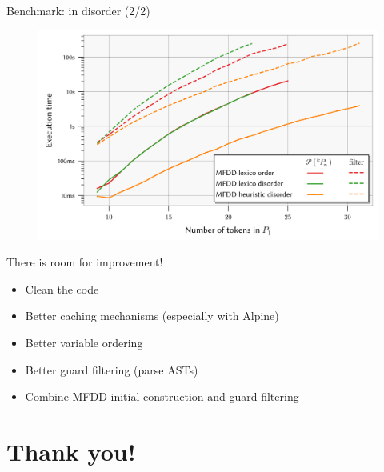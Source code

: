 \documentclass[10pt]{beamer}
\begin{document}
\begin{frame}[fragile]{Benchmark: in disorder (2/2)}
    \begin{figure}
        \centering
        \includegraphics[width=1.0\textwidth]{bench5v2.png}
    \end{figure}
\end{frame}

\begin{frame}[fragile]{There is room for improvement!}
    \begin{itemize}
        \setlength\itemsep{1.15em}
        \item Clean the code
        \item Better caching mechanisms (especially with Alpine)
        \item Better variable ordering
        \item Better guard filtering (parse ASTs)
        \item Combine MFDD initial construction and guard filtering
    \end{itemize}
\end{frame}

\section{Thank you!}
\end{document}
